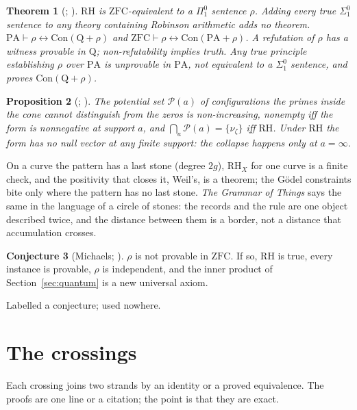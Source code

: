 \documentclass[11pt]{article}
\newtheorem{theorem}{Theorem}[section]
\newtheorem{proposition}[theorem]{Proposition}
\theoremstyle{definition}
\newtheorem{conjecture}[theorem]{Conjecture}
\theoremstyle{remark}
\newcommand{\PA}{\mathrm{PA}}
\newcommand{\ZFC}{\mathrm{ZFC}}
\newcommand{\Con}{\mathrm{Con}}
\newcommand{\PS}{\mathcal P}
\begin{document}
\begin{theorem}[{\cite[Thms.\ 4.1, 5.1, 6.1]{gstring}}; \cite{dmr}]\label{thm:godel}
$\mathrm{RH}$ is $\ZFC$-equivalent to a $\Pi^0_1$ sentence $\rho$. Adding every true $\Sigma^0_1$ sentence to any theory containing Robinson arithmetic adds no theorem. $\PA\vdash\rho\leftrightarrow\Con(\mathrm Q+\rho)$ and $\ZFC\vdash\rho\leftrightarrow\Con(\PA+\rho)$. A refutation of $\rho$ has a witness provable in $\mathrm Q$; non-refutability implies truth. Any true principle establishing $\rho$ over $\PA$ is unprovable in $\PA$, not equivalent to a $\Sigma^0_1$ sentence, and proves $\Con(\mathrm Q+\rho)$.
\end{theorem}
\begin{proposition}[{\cite[Props.\ 2.2--2.3]{potential}}; {\cite[Prop.\ 2.11]{horizon}}]\label{prop:potential}
The potential set $\PS(a)$ of configurations the primes inside the cone cannot distinguish from the zeros is non-increasing, nonempty iff the form is nonnegative at support $a$, and $\bigcap_a\PS(a)=\{\nu_\zeta\}$ iff $\mathrm{RH}$. Under $\mathrm{RH}$ the form has no null vector at any finite support: the collapse happens only at $a=\infty$.
\end{proposition}
On a curve the pattern has a last stone (degree $2g$), $\mathrm{RH}_X$ for one curve is a finite check, and the positivity that closes it, Weil's, is a theorem; the Gödel constraints bite only where the pattern has no last stone. \emph{The Grammar of Things} \cite{grammar} says the same in the language of a circle of stones: the records and the rule are one object described twice, and the distance between them is a border, not a distance that accumulation crosses.
\begin{conjecture}[Michaels; {\cite[\S10]{gstring}}]\label{conj}
$\rho$ is not provable in $\ZFC$. If so, $\mathrm{RH}$ is true, every instance is provable, $\rho$ is independent, and the inner product of Section~\ref{sec:quantum} is a new universal axiom.
\end{conjecture}
Labelled a conjecture; used nowhere.

\section{The crossings}\label{sec:cross}

Each crossing joins two strands by an identity or a proved equivalence. The proofs are one line or a citation; the point is that they are exact.
\end{document}
